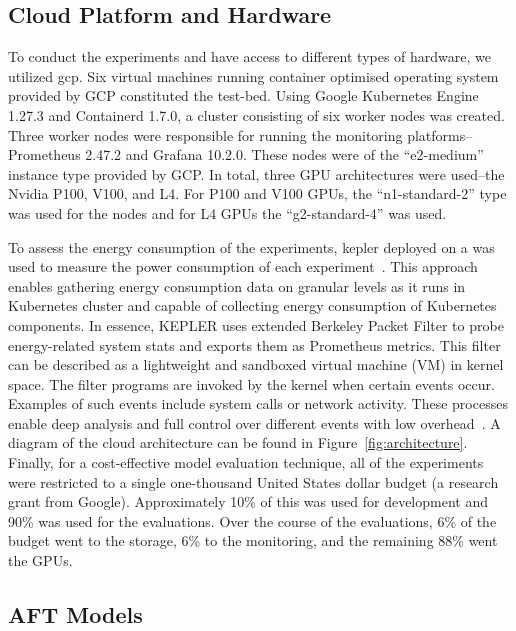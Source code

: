 \documentclass[sn-mathphys-num]{sn-jnl}%
\begin{document}
\subsection{Cloud Platform and Hardware}
To conduct the experiments and have access to different types of hardware, we utilized \acrshort{gcp}\@.
Six virtual machines running container optimised operating system provided by GCP constituted the test-bed.
Using Google Kubernetes Engine 1.27.3 and Containerd 1.7.0, a cluster consisting of six worker nodes was created.
Three worker nodes were responsible for running the monitoring platforms-- Prometheus 2.47.2 and Grafana 10.2.0.
These nodes were of the ``e2-medium'' instance type provided by GCP\@.
In total, three GPU architectures were used--the Nvidia P100, V100, and L4\@.
For P100 and V100 GPUs, the ``n1-standard-2'' type was used for the nodes and for L4 GPUs the ``g2-standard-4'' was used.

To assess the energy consumption of the experiments, \Gls{kepler} deployed on a was used to measure the power consumption of each experiment~\cite{amaral2023kepler}. This approach enables gathering energy consumption data on granular levels as it runs in Kubernetes cluster and capable of collecting energy consumption of Kubernetes components. In essence, KEPLER uses extended Berkeley Packet Filter to probe energy-related system stats and exports them as Prometheus metrics. This filter can be described as a lightweight and sandboxed virtual machine (VM) in kernel space. The filter programs are invoked by the kernel when certain events occur. Examples of such events include system calls or network activity. These processes enable deep analysis and full control over different events with low overhead~\cite{sedghpour@ebpf}. A diagram of the cloud architecture can be found in Figure~\ref{fig:architecture}. Finally, for a cost-effective model evaluation technique, all of the experiments were restricted to a single one-thousand United States dollar budget (a research grant from Google). Approximately 10\% of this was used for development and 90\% was used for the evaluations.
Over the course of the evaluations, 6\% of the budget went to the storage, 6\% to the monitoring, and the remaining 88\% went the GPUs.



\subsection{AFT Models}
\end{document}

